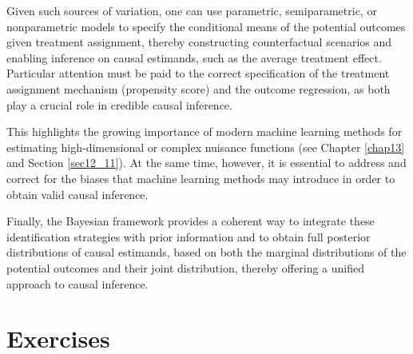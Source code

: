 Given such sources of variation, one can use parametric, semiparametric, or nonparametric models to specify the conditional means of the potential outcomes given treatment assignment, thereby constructing counterfactual scenarios and enabling inference on causal estimands, such as the average treatment effect. Particular attention must be paid to the correct specification of the treatment assignment mechanism (propensity score) and the outcome regression, as both play a crucial role in credible causal inference. 

This highlights the growing importance of modern machine learning methods for estimating high-dimensional or complex nuisance functions (see Chapter \ref{chap13} and Section \ref{sec12_11}). At the same time, however, it is essential to address and correct for the biases that machine learning methods may introduce in order to obtain valid causal inference.

Finally, the Bayesian framework provides a coherent way to integrate these identification strategies with prior information and to obtain full posterior distributions of causal estimands, based on both the marginal distributions of the potential outcomes and their joint distribution, thereby offering a unified approach to causal inference.



\section{Exercises}

